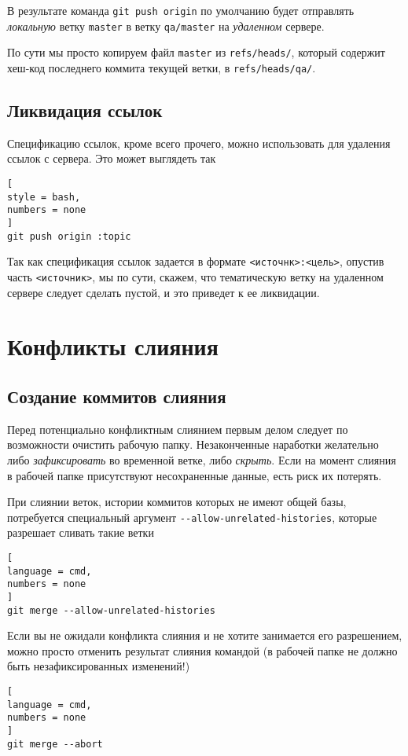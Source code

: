 \documentclass[%
	11pt,
	a4paper,
	utf8,
		]{article}
\begin{document}
В результате команда \texttt{git push origin} по умолчанию будет отправлять \emph{локальную} ветку \texttt{master} в ветку \verb|qa/master| на \emph{удаленном} сервере.

По сути мы просто копируем файл \texttt{master} из \verb|refs/heads/|, который содержит хеш-код последнего коммита текущей ветки, в \verb|refs/heads/qa/|.

\subsection{Ликвидация ссылок}

Спецификацию ссылок, кроме всего прочего, можно использовать для удаления ссылок с сервера. Это может выглядеть так
\begin{lstlisting}[
style = bash,
numbers = none
]
git push origin :topic
\end{lstlisting}

Так как спецификация ссылок задается в формате \verb|<источнк>:<цель>|, опустив часть \verb|<источник>|, мы по сути, скажем, что тематическую ветку на удаленном сервере следует сделать пустой, и это приведет к ее ликвидации.




\section{Конфликты слияния}

\subsection{Создание коммитов слияния}

Перед потенциально конфликтным слиянием первым делом следует по возможности очистить рабочую папку. Незаконченные наработки желательно либо \emph{зафиксировать} во временной ветке, либо \emph{скрыть}. Если на момент слияния в рабочей папке присутствуют несохраненные данные, есть риск их потерять.

При слиянии веток, истории коммитов которых не имеют общей базы, потребуется специальный аргумент \verb|--allow-unrelated-histories|, которые разрешает сливать такие ветки
\begin{lstlisting}[
language = cmd,
numbers = none
]
git merge --allow-unrelated-histories
\end{lstlisting}

Если вы не ожидали конфликта слияния и не хотите занимается его разрешением, можно просто отменить результат слияния командой (в рабочей папке не должно быть незафиксированных изменений!)
\begin{lstlisting}[
language = cmd,
numbers = none
]
git merge --abort
\end{lstlisting}
\end{document}
